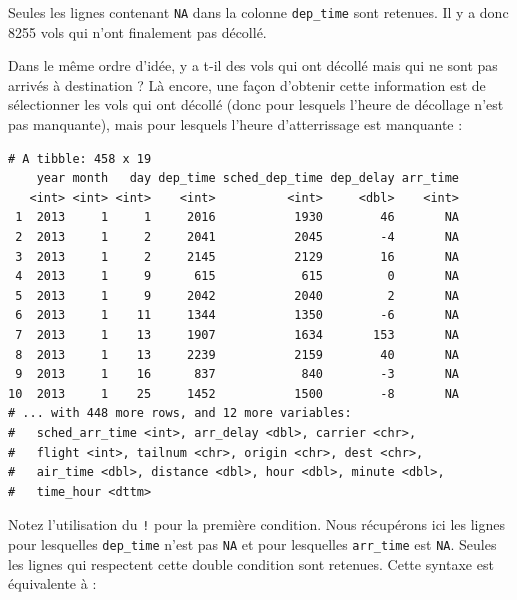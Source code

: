 \documentclass[a4paperpaper,]{article}
\newenvironment{Shaded}{\begin{snugshade}}{\end{snugshade}}
\newcommand{\KeywordTok}[1]{\textcolor[rgb]{0.12,0.11,0.11}{\textbf{#1}}}
\newcommand{\NormalTok}[1]{\textcolor[rgb]{0.12,0.11,0.11}{#1}}
\newcommand{\OperatorTok}[1]{\textcolor[rgb]{0.12,0.11,0.11}{#1}}
\newcommand{\StringTok}[1]{\textcolor[rgb]{0.75,0.01,0.01}{#1}}
\begin{document}
Seules les lignes contenant \texttt{NA} dans la colonne \texttt{dep\_time} sont retenues. Il y a donc 8255 vols qui n'ont finalement pas décollé.

Dans le même ordre d'idée, y a t-il des vols qui ont décollé mais qui ne sont pas arrivés à destination ? Là encore, une façon d'obtenir cette information est de sélectionner les vols qui ont décollé (donc pour lesquels l'heure de décollage n'est pas manquante), mais pour lesquels l'heure d'atterrissage est manquante :

\begin{Shaded}
\end{Shaded}

\begin{verbatim}
# A tibble: 458 x 19
    year month   day dep_time sched_dep_time dep_delay arr_time
   <int> <int> <int>    <int>          <int>     <dbl>    <int>
 1  2013     1     1     2016           1930        46       NA
 2  2013     1     2     2041           2045        -4       NA
 3  2013     1     2     2145           2129        16       NA
 4  2013     1     9      615            615         0       NA
 5  2013     1     9     2042           2040         2       NA
 6  2013     1    11     1344           1350        -6       NA
 7  2013     1    13     1907           1634       153       NA
 8  2013     1    13     2239           2159        40       NA
 9  2013     1    16      837            840        -3       NA
10  2013     1    25     1452           1500        -8       NA
# ... with 448 more rows, and 12 more variables:
#   sched_arr_time <int>, arr_delay <dbl>, carrier <chr>,
#   flight <int>, tailnum <chr>, origin <chr>, dest <chr>,
#   air_time <dbl>, distance <dbl>, hour <dbl>, minute <dbl>,
#   time_hour <dttm>
\end{verbatim}

Notez l'utilisation du \texttt{!} pour la première condition. Nous récupérons ici les lignes pour lesquelles \texttt{dep\_time} n'est pas \texttt{NA} et pour lesquelles \texttt{arr\_time} est \texttt{NA}. Seules les lignes qui respectent cette double condition sont retenues. Cette syntaxe est équivalente à :

\begin{Shaded}
\end{Shaded}
\end{document}
